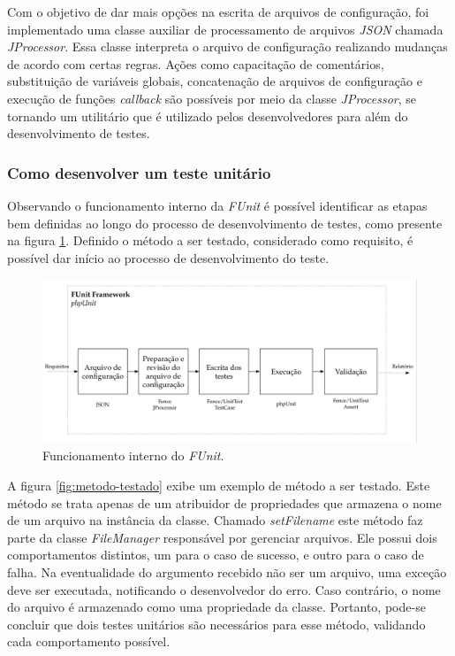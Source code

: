 Com o objetivo de dar mais opções na escrita de arquivos de configuração, foi implementado uma classe auxiliar de processamento de arquivos \emph{JSON} chamada \emph{JProcessor}. Essa classe interpreta o arquivo de configuração realizando mudanças de acordo com certas regras. Ações como capacitação de comentários, substituição de variáveis globais, concatenação de arquivos de configuração e execução de funções \emph{callback} são possíveis por meio da classe \emph{JProcessor}, se tornando um utilitário que é utilizado pelos desenvolvedores para além do desenvolvimento de testes.

\hypertarget{como-desenvolver-um-teste-unitario}{%
\subsubsection{Como desenvolver um teste unitário}\label{como-desenvolver-um-teste-unitario}}

Observando o funcionamento interno da \emph{FUnit} é possível identificar as etapas bem definidas ao longo do processo de desenvolvimento de testes, como presente na figura \ref{fig:funit-phpunit}. Definido o método a ser testado, considerado como requisito, é possível dar início ao processo de desenvolvimento do teste.

\begin{figure}[H]
    \centering
    \includegraphics[width=14cm]{source/4-solucao/images/funit-phpunit.png}
    \caption{Funcionamento interno do \emph{FUnit}.}
    \label{fig:funit-phpunit}
\end{figure}

A figura \ref{fig:metodo-testado} exibe um exemplo de método a ser testado. Este método se trata apenas de um atribuidor de propriedades que armazena o nome de um arquivo na instância da classe. Chamado \emph{setFilename} este método faz parte da classe \emph{FileManager} responsável por gerenciar arquivos. Ele possui dois comportamentos distintos, um para o caso de sucesso, e outro para o caso de falha. Na eventualidade do argumento recebido não ser um arquivo, uma exceção deve ser executada, notificando o desenvolvedor do erro. Caso contrário, o nome do arquivo é armazenado como uma propriedade da classe. Portanto, pode-se concluir que dois testes unitários são necessários para esse método, validando cada comportamento possível.

